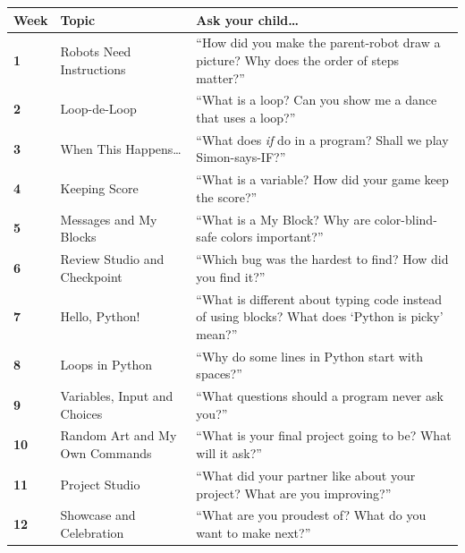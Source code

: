 \documentclass[level=1]{kidscode}
\begin{document}
\begin{center}\small\renewcommand{\arraystretch}{1.45}
\begin{tabularx}{\linewidth}{@{}>{\bfseries}p{1.3cm}>{\RaggedRight}p{4.2cm}>{\RaggedRight\arraybackslash}X@{}}
\toprule
Week & Topic & Ask your child\dots\\
\midrule
1 & Robots Need Instructions & \enquote{How did you make the parent-robot draw a picture? Why does the order of steps matter?}\\
2 & Loop-de-Loop & \enquote{What is a loop? Can you show me a dance that uses a loop?}\\
3 & When This Happens\dots & \enquote{What does \emph{if} do in a program? Shall we play Simon-says-IF?}\\
4 & Keeping Score & \enquote{What is a variable? How did your game keep the score?}\\
5 & Messages and My Blocks & \enquote{What is a My Block? Why are color-blind-safe colors important?}\\
6 & Review Studio and Checkpoint & \enquote{Which bug was the hardest to find? How did you find it?}\\
7 & Hello, Python! & \enquote{What is different about typing code instead of using blocks? What does \enquote{Python is picky} mean?}\\
8 & Loops in Python & \enquote{Why do some lines in Python start with spaces?}\\
9 & Variables, Input and Choices & \enquote{What questions should a program never ask you?}\\
10 & Random Art and My Own Commands & \enquote{What is your final project going to be? What will it ask?}\\
11 & Project Studio & \enquote{What did your partner like about your project? What are you improving?}\\
12 & Showcase and Celebration & \enquote{What are you proudest of? What do you want to make next?}\\
\bottomrule
\end{tabularx}
\end{center}
\end{document}

